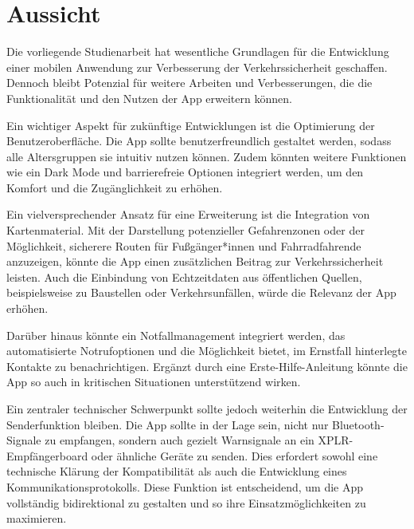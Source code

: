\documentclass[a4paper, 12pt]{article} %
\begin{document}
\clearpage

\section{Aussicht}




\begin{spacing}{1.8}  %
\fontsize{14pt}{15pt}\selectfont  %

Die vorliegende Studienarbeit hat wesentliche Grundlagen für die Entwicklung einer mobilen Anwendung zur Verbesserung der Verkehrssicherheit geschaffen. Dennoch bleibt Potenzial für weitere Arbeiten und Verbesserungen, die die Funktionalität und den Nutzen der App erweitern können.

Ein wichtiger Aspekt für zukünftige Entwicklungen ist die 
Optimierung der Benutzeroberfläche. Die App sollte benutzerfreundlich 
gestaltet werden, sodass alle Altersgruppen sie intuitiv nutzen können. 
Zudem könnten weitere Funktionen wie ein Dark Mode und barrierefreie 
Optionen integriert 
werden, um den Komfort und die Zugänglichkeit zu erhöhen.

Ein vielversprechender Ansatz für eine
Erweiterung ist die Integration von Kartenmaterial.
 Mit der Darstellung potenzieller Gefahrenzonen oder der 
 Möglichkeit, sicherere Routen für Fußgänger*innen und Fahrradfahrende 
 anzuzeigen, könnte die App einen zusätzlichen Beitrag zur 
 Verkehrssicherheit leisten. Auch die Einbindung von Echtzeitdaten 
 aus öffentlichen Quellen, beispielsweise zu Baustellen oder 
 Verkehrsunfällen, würde die Relevanz der App erhöhen.

Darüber hinaus könnte ein Notfallmanagement integriert 
werden, das automatisierte Notrufoptionen und die Möglichkeit 
bietet, im Ernstfall hinterlegte Kontakte zu benachrichtigen. 
Ergänzt durch eine Erste-Hilfe-Anleitung könnte die App so auch in 
kritischen Situationen unterstützend wirken.

Ein zentraler technischer Schwerpunkt
 sollte jedoch weiterhin die Entwicklung der Senderfunktion 
 bleiben. Die App sollte in der Lage sein, nicht nur Bluetooth-Signale
  zu empfangen, sondern auch gezielt Warnsignale an ein 
  XPLR-Empfängerboard oder ähnliche Geräte zu senden. 
  Dies erfordert sowohl eine technische Klärung der Kompatibilität 
  als auch die Entwicklung eines Kommunikationsprotokolls. 
  Diese Funktion ist entscheidend, um die App vollständig 
  bidirektional zu gestalten und so ihre Einsatzmöglichkeiten zu 
  maximieren.


\end{spacing}
\end{document}

